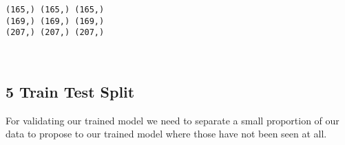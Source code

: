 \documentclass[11pt]{article}
\begin{document}
    \begin{Verbatim}[commandchars=\\\{\}]
(165,) (165,) (165,)
(169,) (169,) (169,)
(207,) (207,) (207,)

    \end{Verbatim}

    \begin{center}
    \end{center}
    { \hspace*{\fill} \\}
    
    \hypertarget{train-test-split}{%
\subsection{5 Train Test Split}\label{train-test-split}}

For validating our trained model we need to separate a small proportion
of our data to propose to our trained model where those have not been
seen at all.
\end{document}

